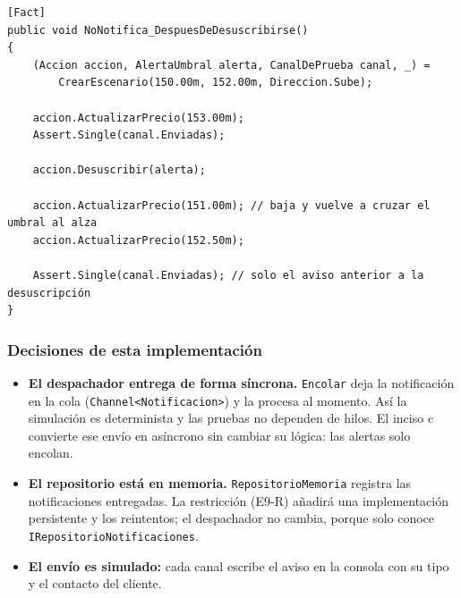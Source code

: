 \begin{lstlisting}[basicstyle=\ttfamily\footnotesize, columns=fullflexible, keepspaces=true, caption={Prueba de la desuscripción.}]
[Fact]
public void NoNotifica_DespuesDeDesuscribirse()
{
    (Accion accion, AlertaUmbral alerta, CanalDePrueba canal, _) =
        CrearEscenario(150.00m, 152.00m, Direccion.Sube);

    accion.ActualizarPrecio(153.00m);
    Assert.Single(canal.Enviadas);

    accion.Desuscribir(alerta);

    accion.ActualizarPrecio(151.00m); // baja y vuelve a cruzar el umbral al alza
    accion.ActualizarPrecio(152.50m);

    Assert.Single(canal.Enviadas); // solo el aviso anterior a la desuscripción
}
\end{lstlisting}

\subsubsection{Decisiones de esta implementación}

\begin{itemize}
  \item \textbf{El despachador entrega de forma síncrona.} \texttt{Encolar} deja la
        notificación en la cola (\texttt{Channel<Notificacion>}) y la procesa al momento. Así
        la simulación es determinista y las pruebas no dependen de hilos. El inciso c
        convierte ese envío en asíncrono sin cambiar su lógica: las alertas solo encolan.
  \item \textbf{El repositorio está en memoria.} \texttt{RepositorioMemoria} registra las
        notificaciones entregadas. La restricción (E9-R) añadirá una implementación
        persistente y los reintentos; el despachador no cambia, porque solo conoce
        \texttt{IRepositorioNotificaciones}.
  \item \textbf{El envío es simulado:} cada canal escribe el aviso en la consola con su tipo
        y el contacto del cliente.
\end{itemize}

